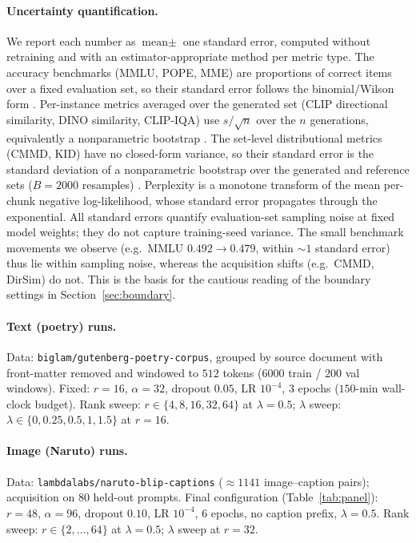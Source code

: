 \documentclass{article}
\begin{document}
\paragraph{Uncertainty quantification.}
We report each number as $\text{mean}\pm$ one standard error, computed without
retraining and with an estimator-appropriate method per metric type. The accuracy
benchmarks (MMLU, POPE, MME) are proportions of correct items over a fixed
evaluation set, so their standard error follows the binomial/Wilson form
\citep{wilson1927,brown2001interval}. Per-instance metrics averaged over the
generated set (CLIP directional similarity, DINO similarity, CLIP-IQA) use
$s/\sqrt{n}$ over the $n$ generations, equivalently a nonparametric bootstrap
\citep{efron1993bootstrap}. The set-level distributional metrics (CMMD, KID) have
no closed-form variance, so their standard error is the standard deviation of a
nonparametric bootstrap over the generated and reference sets ($B{=}2000$
resamples) \citep{efron1993bootstrap,binkowski2018demystifying}. Perplexity is a
monotone transform of the mean per-chunk negative log-likelihood, whose standard
error propagates through the exponential. All standard errors quantify
evaluation-set sampling noise at fixed model weights; they do not capture
training-seed variance. The small benchmark movements we observe (e.g.\ MMLU
$0.492\!\to\!0.479$, within $\sim\!1$ standard error) thus lie within sampling
noise, whereas the acquisition shifts (e.g.\ CMMD, DirSim) do not. This is the
basis for the cautious reading of the boundary settings in
Section~\ref{sec:boundary}.

\paragraph{Text (poetry) runs.}
Data: \texttt{biglam/gutenberg-poetry-corpus}, grouped by source document with
front-matter removed and windowed to $512$ tokens ($6000$ train / $200$ val
windows). Fixed: $r{=}16$, $\alpha{=}32$, dropout $0.05$, LR $10^{-4}$, $3$
epochs ($150$-min wall-clock budget). Rank sweep: $r\in\{4,8,16,32,64\}$ at
$\lambda{=}0.5$; $\lambda$ sweep: $\lambda\in\{0,0.25,0.5,1,1.5\}$ at $r{=}16$.

\paragraph{Image (Naruto) runs.}
Data: \texttt{lambdalabs/naruto-blip-captions} ($\approx$$1141$ image--caption
pairs); acquisition on $80$ held-out prompts. Final configuration
(Table~\ref{tab:panel}): $r{=}48$, $\alpha{=}96$, dropout $0.10$, LR $10^{-4}$,
$6$ epochs, no caption prefix, $\lambda{=}0.5$. Rank sweep:
$r\in\{2,\dots,64\}$ at $\lambda{=}0.5$; $\lambda$ sweep at $r{=}32$.
\end{document}
